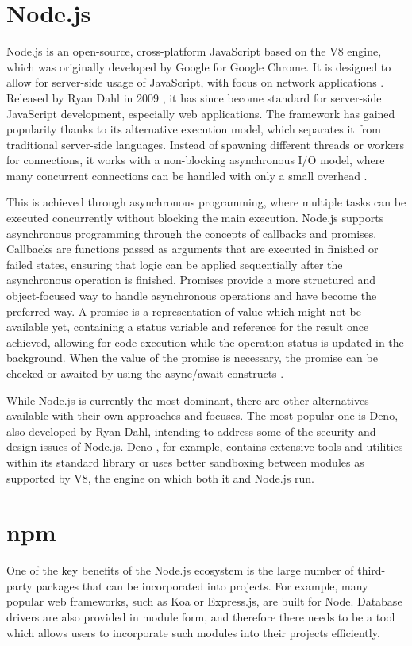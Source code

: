 \section*{Node.js}
Node.js is an open-source, cross-platform JavaScript based on the V8 engine,
which was originally developed by Google for Google Chrome. It is designed to
allow for server-side usage of JavaScript, with focus on network applications
\cite{node-about}. Released by Ryan Dahl in 2009 \cite{ryan-node}, it has since
become standard for server-side JavaScript development, especially web
applications. The framework has gained popularity thanks to its alternative
execution model, which separates it from traditional server-side languages.
Instead of spawning different threads or workers for connections, it works with
a non-blocking asynchronous I/O model, where many concurrent connections can be
handled with only a small overhead \cite{orsini_2013}.

This is achieved through asynchronous programming, where multiple tasks can be
executed concurrently without blocking the main execution. Node.js supports
asynchronous programming through the concepts of callbacks and promises.
Callbacks are functions passed as arguments that are executed in finished or
failed states, ensuring that logic can be applied sequentially after the
asynchronous operation is finished. Promises provide a more structured and
object-focused way to handle asynchronous operations and have become the
preferred way. A promise is a representation of value which might not be
available yet, containing a status variable and reference for the result once
achieved, allowing for code execution while the operation status is updated in
the background. When the value of the promise is necessary, the promise can be
checked or awaited by using the async/await constructs
\cite{PromiseJavaScriptMDN_2023}.

While Node.js is currently the most dominant, there are other alternatives
available with their own approaches and focuses. The most popular one is Deno,
also developed by Ryan Dahl, intending to address some of the security and
design issues of Node.js. Deno \cite{Deno}, for example, contains extensive
tools and utilities within its standard library or uses better sandboxing
between modules as supported by V8, the engine on which both it and Node.js run.

\section*{npm}
One of the key benefits of the Node.js ecosystem is the large number of
third-party packages that can be incorporated into projects. For example, many
popular web frameworks, such as Koa or Express.js, are built for Node. Database
drivers are also provided in module form, and therefore there needs to be a tool
which allows users to incorporate such modules into their projects efficiently. 

